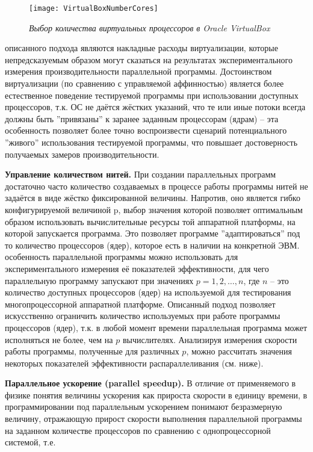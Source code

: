 {	\begin{figure}[H]
		\texttt{[image: VirtualBoxNumberCores]}
		\caption{\textit{Выбор количества виртуальных процессоров в Oracle VirtualBox}}
		\label{VirtualBoxNumberCores:image}
	\end{figure}
	 описанного подхода являются накладные расходы виртуализации, которые непредсказуемым образом могут сказаться на результатах экспериментального измерения производительности параллельной программы. Достоинством виртуализации (по сравнению с управляемой аффинностью) является более естественное поведение тестируемой программы при использовании доступных процессоров, т.к. ОС не даётся жёстких указаний, что те или иные потоки всегда должны быть ''привязаны'' к заранее заданным процессорам (ядрам) – эта особенность позволяет более точно воспроизвести сценарий потенциального ''живого'' использования тестируемой программы, что повышает достоверность получаемых замеров производительности. 
	\par\textbf{Управление количеством нитей.} При создании параллельных программ достаточно часто количество создаваемых в процессе работы программы нитей не задаётся в виде жёстко фиксированной величины. Напротив, оно является гибко конфигурируемой величиной p, выбор значения которой позволяет оптимальным образом использовать вычислительные ресурсы той аппаратной платформы, на которой запускается программа. Это позволяет программе ''адаптироваться'' под то количество процессоров (ядер), которое есть в наличии на конкретной ЭВМ.
	 особенность параллельной программы можно использовать для экспериментального измерения её показателей эффективности, для чего параллельную программу запускают при значениях $p = 1,2,…,n$, где $n$ – это количество доступных процессоров (ядер) на используемой для тестирования многопроцессорной аппаратной платформе. Описанный подход позволяет искусственно ограничить количество используемых при работе программы процессоров (ядер), т.к. в любой момент времени параллельная программа может исполняться не более, чем на $p$ вычислителях. Анализируя измерения скорости работы программы, полученные для различных $p$, можно рассчитать значения некоторых показателей эффективности распараллеливания (см. ниже).
	\par\textbf{Параллельное ускорение (parallel speedup).} В отличие от применяемого в физике понятия величины ускорения как прироста скорости в единицу времени, в программировании под параллельным ускорением понимают безразмерную величину, отражающую прирост скорости выполнения параллельной программы на заданном количестве процессоров по сравнению с однопроцессорной системой, т.е.
}
